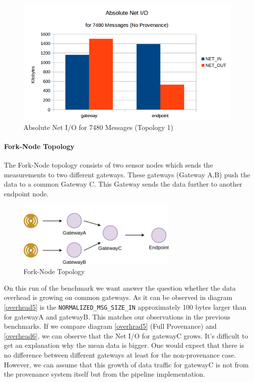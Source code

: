 \begin{figure}[H]
	\center
	\includegraphics[width=\textwidth]{figures/overheaddiagram8.png}
	\caption{Absolute Net I/O for 7480 Messages (Topology 1)}
	\label{fig:topo1absolutewithouotprov}
\end{figure}



\paragraph*{Fork-Node Topology}
The Fork-Node topology consists of two sensor nodes which sends the measurements to two different gateways. These gateways (Gateway A,B) push the data to a common Gateway C. This Gateway sends the data further to another endpoint node.

\begin{figure}[H]
	\center
	\includegraphics[width=0.7\textwidth]{figures/dataoverheadtopolabeled2.png}
	\caption{Fork-Node Topology}
	\label{fig:deployment}
\end{figure}


On this run of the benchmark we want answer the question whether the data overhead is growing on common gateways. As it can be observed in diagram \ref{overhead5} is the \texttt{NORMALIZED\_MSG\_SIZE\_IN} approximately 100 bytes larger than for gatewayA and gatewayB. This matches our observations in the previous benchmarks.
If we compare diagram \ref{overhrad5} (Full Provenance) and  \ref{overhead6}, we can observe that the Net I/O for gatewayC grows. It's difficult to get an explanation why the mean data is bigger. One would expect that there is no difference between different gateways at least for the non-provenance case.
However, we can assume that this growth of data traffic for gatewayC is not from the provenance system itself but from the pipeline implementation.


